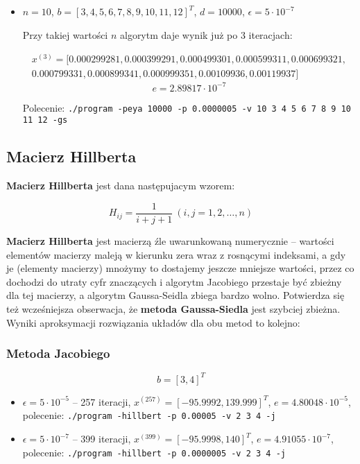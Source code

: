 \documentclass[a4paper,11pt]{article}
\begin{document}
\begin{itemize}
    \item $ n = 10 $, $ b = [3, 4, 5, 6, 7, 8, 9, 10, 11, 12]^T$, $ d = 10000 $, $ \epsilon = 5 \cdot 10^{-7} $
    
      Przy takiej wartości $ n $ algorytm daje wynik już po 3 iteracjach:
        
      \begin{align*}
        x^{(3)} = [0.000299281, 0.000399291, 0.000499301, 0.000599311, 0.000699321, \\ 0.000799331, 0.000899341, 0.000999351, 0.00109936, 0.00119937]
      \end{align*}
      $$ e = 2.89817 \cdot 10^{-7} $$
      
      Polecenie: \texttt{./program -peya 10000 -p 0.0000005 -v 10 3 4 5 6 7 8 9 10 11 12 -gs}  
  \end{itemize}

\subsection{Macierz Hillberta}
  \textbf{Macierz Hillberta} jest dana następujacym wzorem:
    
    $$ H_{ij} = \frac {1} {i + j + 1} \: (i, j = 1, 2, \dots, n) $$
    
  \textbf{Macierz Hillberta} jest macierzą źle uwarunkowaną numerycznie -- wartości 
  elementów macierzy maleją w kierunku zera wraz z rosnącymi indeksami, a gdy je (elementy macierzy)
  mnożymy to dostajemy jeszcze mniejsze wartości, przez co dochodzi do utraty cyfr znaczących
  i algorytm Jacobiego przestaje być zbieżny dla tej macierzy, a algorytm Gaussa-Seidla 
  zbiega bardzo wolno. Potwierdza się też wcześniejsza obserwacja, że 
  \textbf{metoda Gaussa-Siedla} jest szybciej zbieżna. Wyniki aproksymacji rozwiązania 
  układów dla obu metod to kolejno:
    \subsubsection{Metoda Jacobiego}
      $$ b = [3, 4]^T $$
    \begin{itemize}
      \item $ \epsilon = 5 \cdot 10^{-5} $ -- 257 iteracji, $ x^{(257)} = [-95.9992, 139.999]^T $, $ e = 4.80048 \cdot 10^{-5} $,
            polecenie: \texttt{./program -hillbert -p 0.00005 -v 2 3 4 -j}
      \item $ \epsilon = 5 \cdot 10^{-7} $ -- 399 iteracji, $ x^{(399)} = [-95.9998, 140]^T $, $ e = 4.91055 \cdot 10^{-7} $,
            polecenie: \texttt{./program -hillbert -p 0.0000005 -v 2 3 4 -j}
    \end{itemize}
    
\end{document}
